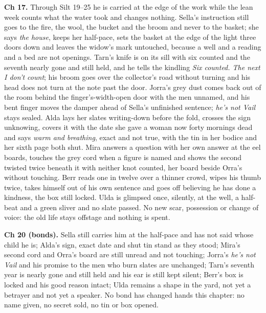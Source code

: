 \documentclass{design/chronicle}
\begin{document}
{\textbf{Ch 17.} Through Silt 19–25 he is carried at the edge of the work while the lean week counts what the water took and changes nothing. Sella’s instruction still goes to the fire, the wool, the bucket and the broom and never to the basket; she says \emph{the house}, keeps her half-pace, sets the basket at the edge of the light three doors down and leaves the widow’s mark untouched, because a well and a reading and a bed are not openings. Tarn’s knife is on its sill with six counted and the seventh nearly gone and still held, and he tells the kindling \emph{Six counted. The next I don’t count}; his broom goes over the collector’s road without turning and his head does not turn at the note past the door. Jorra’s grey dust comes back out of the room behind the finger’s-width-open door with the men unnamed, and his bent finger moves the damper ahead of Sella’s unfinished sentence; \emph{he’s not Vail} stays sealed. Alda lays her slates writing-down before the fold, crosses the sign unknowing, covers it with the date she gave a woman now forty mornings dead and says \emph{warm and breathing}, exact and not true, with the tin in her bodice and her sixth page both shut. Mira answers a question with her own answer at the eel boards, touches the grey cord when a figure is named and shows the second twisted twice beneath it with neither knot counted, her board beside Orra’s without touching. Berr reads one in twelve over a thinner crowd, wipes his thumb twice, takes himself out of his own sentence and goes off believing he has done a kindness, the box still locked. Ulda is glimpsed once, silently, at the well, a half-beat and a green sliver and no slate passed. No new scar, possession or change of voice: the old life stays offstage and nothing is spent.

\textbf{Ch 20 (bonds).} Sella still carries him at the half-pace and has not said whose child he is; Alda’s sign, exact date and shut tin stand as they stood; Mira’s second cord and Orra’s board are still unread and not touching; Jorra’s \emph{he’s not Vail} and his promise to the men who burn slates are unchanged; Tarn’s seventh year is nearly gone and still held and his ear is still kept silent; Berr’s box is locked and his good reason intact; Ulda remains a shape in the yard, not yet a betrayer and not yet a speaker. No bond has changed hands this chapter: no name given, no secret sold, no tin or box opened.

}
\end{document}
